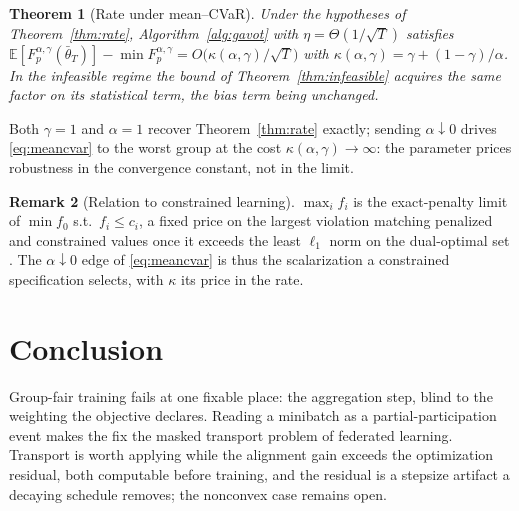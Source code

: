 \documentclass{article}
\newtheorem{theorem}{Theorem}
\theoremstyle{definition}
\newtheorem{remark}[theorem]{Remark}
\newcommand{\E}{\mathbb{E}}
\begin{document}
\begin{theorem}[Rate under mean--CVaR]
\label{thm:cvar}
Under the hypotheses of Theorem~\ref{thm:rate}, Algorithm~\ref{alg:gavot} with
$\eta=\Theta(1/\sqrt{T})$ satisfies
$\E[F_p^{\alpha,\gamma}(\bar\theta_T)]-\min F_p^{\alpha,\gamma}
=O\!\big(\kappa(\alpha,\gamma)/\sqrt{T}\big)$ with
$\kappa(\alpha,\gamma)=\gamma+(1-\gamma)/\alpha$. In the infeasible regime the
bound of Theorem~\ref{thm:infeasible} acquires the same factor on its
statistical term, the bias term being unchanged.
\end{theorem}

Both $\gamma=1$ and $\alpha=1$ recover Theorem~\ref{thm:rate} exactly; sending
$\alpha\downarrow 0$ drives \eqref{eq:meancvar} to the worst group at the cost
$\kappa(\alpha,\gamma)\to\infty$: the parameter prices robustness in the
convergence constant, not in the limit.

\begin{remark}[Relation to constrained learning]
\label{rem:penalty}
$\max_i f_i$ is the exact-penalty limit of $\min f_0$ s.t.\ $f_i\le c_i$, a
fixed price on the largest violation matching penalized and constrained values
once it exceeds the least $\ell_1$ norm on the dual-optimal set
\cite{rahimi2026exactpenalty}. The $\alpha\downarrow 0$ edge of
\eqref{eq:meancvar} is thus the scalarization a constrained specification
selects, with $\kappa$ its price in the rate.
\end{remark}



\vspace{-4pt}
\section{Conclusion}

Group-fair training fails at one fixable place: the aggregation step, blind
to the weighting the objective declares. Reading a minibatch as a
partial-participation event makes the fix the masked transport problem of
federated learning. Transport is worth applying while the
alignment gain exceeds the optimization residual, both computable before
training, and the residual is a stepsize artifact a decaying schedule removes;
the nonconvex case remains open.

\clearpage
\renewcommand{\refname}{REFERENCES}
\end{document}
